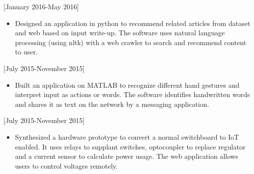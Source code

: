 \documentclass[10pt]{article}
\begin{document}

[January 2016-May 2016]
\begin{itemize}
    \item Designed an application in python to recommend related articles from dataset and web based on input write-up. The software uses natural language processing (using nltk) with a web crawler to search and recommend content to user.
\end{itemize}

[July 2015-November 2015]
\begin{itemize}
    \item Built an application on MATLAB to recognize different hand gestures and interpret input as actions or words. The software identifies handwritten words and shares it as text on the network by a messaging application.
\end{itemize}

[July 2015-November 2015]
\begin{itemize}
    \item Synthesized a hardware prototype to convert a normal switchboard to IoT enabled. It uses relays to supplant switches, optocoupler to replace regulator and a current sensor to calculate power usage. The web application allows users to control voltages remotely.
\end{itemize}
\end{document}
